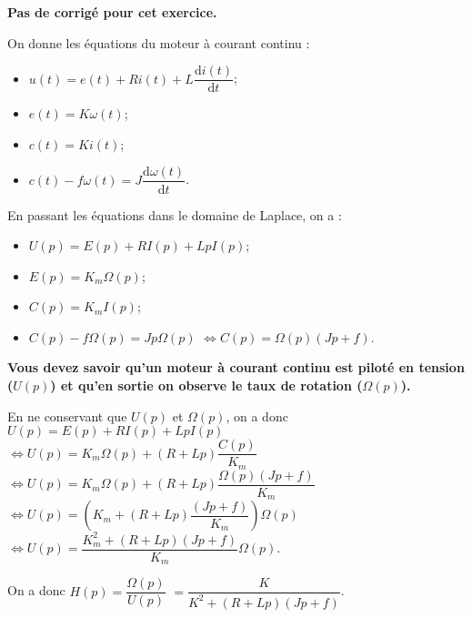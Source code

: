 \normaltrue \difficilefalse \tdifficilefalse
\correctiontrue


\setcounter{numques}{0}
\ifcorrection
\else
\textbf{Pas de corrigé pour cet exercice.}
\fi


\ifprof 
\else
On donne les équations du moteur à courant continu :
\begin{itemize}
\item $u(t) = e(t)+ Ri(t) +L \dfrac{\text{d}i(t)}{\text{d} t}$;
\item $e(t)=K\omega(t)$;
\item $c(t)=Ki(t)$;
\item $c(t)- f\omega(t)=J\dfrac{\text{d}\omega(t)}{\text{d} t}$.
\end{itemize}
\fi

\ifprof
En passant les équations dans le domaine de Laplace, on a : 
\begin{itemize}
\item $U(p) = E(p)+ RI(p) +LpI(p)$;
\item $E(p)=K_m\Omega(p)$;
\item $C(p)=K_mI(p)$;
\item $C(p)- f\Omega(p)=Jp\Omega(p)$ $\Leftrightarrow C(p)=\Omega(p)\left( Jp +f \right)$.
\end{itemize}

\textbf{Vous devez savoir qu'un moteur à courant continu est piloté en tension ($U(p)$) et qu'en sortie on observe le taux de rotation ($\Omega(p)$). }

En ne conservant que $U(p)$ et $\Omega(p)$, on a donc
$U(p) = E(p)+ RI(p) +LpI(p)$
$ \Leftrightarrow U(p) = K_m\Omega(p)+ \left(R +Lp\right)\dfrac{C(p)}{K_m}$
$ \Leftrightarrow U(p) = K_m\Omega(p)+ \left(R +Lp\right)\dfrac{\Omega(p)\left( Jp +f \right)}{K_m}$
$ \Leftrightarrow U(p) = \left(K_m+ \left(R +Lp\right)\dfrac{\left( Jp +f \right)}{K_m}\right)\Omega(p)$
$ \Leftrightarrow U(p) =  \dfrac{K_m^2 + \left(R +Lp\right)\left( Jp +f \right)}{K_m}\Omega(p)$.

On a donc $H(p)=\dfrac{\Omega(p)}{U(p)}$ $=\dfrac{K}{K^2 +\left(R +Lp\right) \left( Jp +f \right)} $.

\else
\fi

